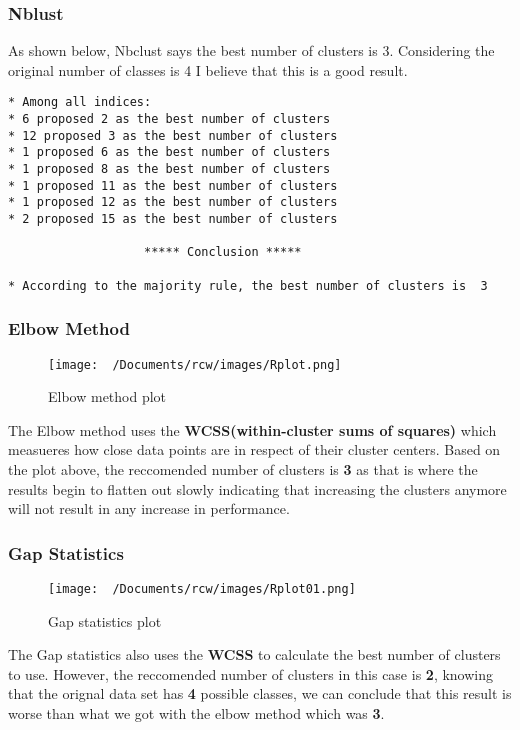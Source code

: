 \documentclass[11pt]{article}
\begin{document}
\subsubsection{Nblust}
As shown below, Nbclust says the best number of clusters is 3. Considering the original number of classes is 4 I believe that this is a good result.
\begin{lstlisting}
* Among all indices:                                                
* 6 proposed 2 as the best number of clusters 
* 12 proposed 3 as the best number of clusters 
* 1 proposed 6 as the best number of clusters 
* 1 proposed 8 as the best number of clusters 
* 1 proposed 11 as the best number of clusters 
* 1 proposed 12 as the best number of clusters 
* 2 proposed 15 as the best number of clusters 

                   ***** Conclusion *****                            
 
* According to the majority rule, the best number of clusters is  3 
\end{lstlisting}

\subsubsection{Elbow Method}
\begin{figure}[H]
  \centering
  \texttt{[image: ~/Documents/rcw/images/Rplot.png]}
  \caption{Elbow method plot}
\end{figure}

The Elbow method uses the \textbf{WCSS(within-cluster sums of squares)} which measueres how close data points are in respect of their cluster centers.
Based on the plot above, the reccomended number of clusters is \textbf{3} as that is where the results begin to flatten out slowly
indicating that increasing the clusters anymore will not result in any increase in performance.

\subsubsection{Gap Statistics}
\begin{figure}[H]
  \centering
  \texttt{[image: ~/Documents/rcw/images/Rplot01.png]}
  \caption{Gap statistics plot}
\end{figure}

The Gap statistics also uses the \textbf{WCSS} to calculate the best number of clusters to use.  
However, the reccomended number of clusters in this case is \textbf{2}, knowing that the orignal data set has \textbf{4} possible classes,
we can conclude that this result is worse than what we got with the elbow method which was \textbf{3}.
\end{document}
